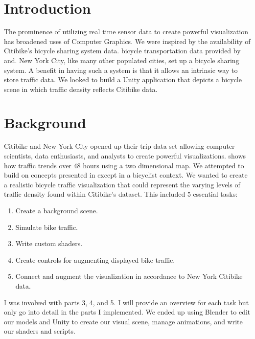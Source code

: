 \documentclass{scrartcl}
\begin{document}

\section{Introduction}

The prominence of utilizing real time sensor data to create powerful visualization has broadened uses of Computer Graphics.  We were inspired by the availability of Citibike's bicycle sharing system data. bicycle transportation data provided by and.  New York City, like many other populated cities, set up a bicycle sharing system.  A benefit in having such a system is that it allows an intrinsic way to store traffic data.  We looked to build a Unity application that depicts a bicycle scene in which traffic density reflects Citibike data.

\section{Background}

Citibike and New York City opened up their trip data set allowing computer scientists, data enthusiasts, and analysts to create powerful visualizations.  \citep{Citibike:Visualization} shows how traffic trends over 48 hours using a two dimensional map.  We attempted to build on concepts presented in \citep{peters2011crowds} except in a bicyclist context.  We wanted to create a realistic bicycle traffic visualization that could represent the varying levels of traffic density found within Citibike's dataset.  This included 5 essential tasks: 

\begin{enumerate}
  \item Create a background scene.
  \item Simulate bike traffic.
  \item Write custom shaders.
  \item Create controls for augmenting displayed bike traffic.
  \item Connect and augment the visualization in accordance to New York Citibike data. 
\end{enumerate}

I was involved with parts 3, 4, and 5.  I will provide an overview for each task but only go into detail in the parts I implemented.  We ended up using Blender to edit our models and Unity to create our visual scene, manage animations, and write our shaders and scripts.
	
\end{document}

